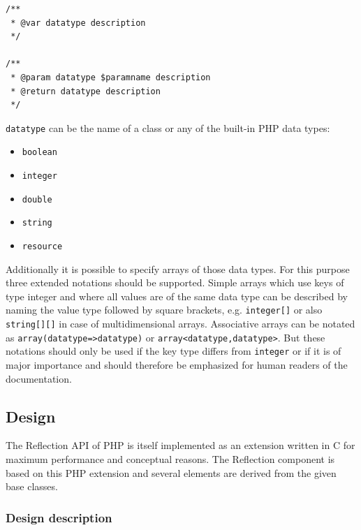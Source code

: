\documentclass[10pt,final,a4paper,oneside]{article}
\begin{document}
\begin{verbatim}
/**
 * @var datatype description
 */

/**
 * @param datatype $paramname description
 * @return datatype description
 */
\end{verbatim}

\noindent
\verb|datatype| can be the name of a class
or any of the built-in PHP data types:

\begin{itemize}
	\item \verb|boolean|
	\item \verb|integer|
	\item \verb|double|
	\item \verb|string|
	\item \verb|resource|
\end{itemize}

Additionally it is possible to specify arrays of those
data types.
For this purpose three extended notations should be supported.
Simple arrays which use keys of type integer and
where all values are of the same data type
can be described by naming the value type followed by square brackets,
e.g. \verb|integer[]| or also \verb|string[][]|
in case of multidimensional arrays.
Associative arrays can be notated as
\verb|array(datatype=>datatype)| or \verb|array<datatype,datatype>|.
But these notations should only be used
if the key type differs from \verb|integer|
or if it is of major importance
and should therefore be emphasized
for human readers of the documentation. 


\subsection{Design}\label{subsec:ReflectionDesign}
%
%

The Reflection API of PHP \cite{PHP5Reflection}
is itself implemented as an extension written in C
for maximum performance and conceptual reasons.
The Reflection component is based on this PHP extension
and several elements are derived from the given base classes.

\subsubsection{Design description}
\end{document}
